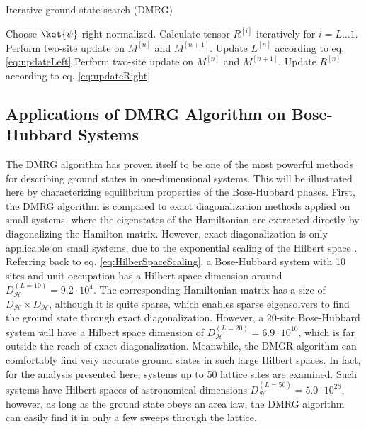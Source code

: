 \begin{algorithm}
\begin{algorithmic}
\caption{Iterative ground state search (DMRG)}
\State Choose $\ket{\psi}$ right-normalized.
\State Calculate tensor $R^{[i]}$ iteratively for $i = L \ldots 1$.
	 
		\State Perform two-site update on $M^{[n]}$ and $M^{[n+1]}$.
		\State Update $L^{[n]}$ according to eq. \eqref{eq:updateLeft}
	\EndFor
	 
		\State Perform two-site update on $M^{[n]}$ and $M^{[n+1]}$.
		\State Update $R^{[n]}$ according to eq. \eqref{eq:updateRight}
	\EndFor
\EndWhile
\end{algorithmic}
\end{algorithm}


\subsection{Applications of DMRG Algorithm on Bose-Hubbard Systems} \label{chap:CondFrac}
The DMRG algorithm has proven itself to be one of the most powerful methods for describing ground states in one-dimensional systems. This will be illustrated here by characterizing equilibrium properties of the Bose-Hubbard phases. First, the DMRG algorithm is compared to exact diagonalization methods applied on small systems, where the eigenstates of the Hamiltonian are extracted directly by diagonalizing the Hamilton matrix. However, exact diagonalization is only applicable on small systems, due to the exponential scaling of the Hilbert space \cite{Vidal2003}. Referring back to eq. \eqref{eq:HilberSpaceScaling}, a Bose-Hubbard system with 10 sites and unit occupation has a Hilbert space dimension around $D_{\mathcal{H}}^{(L = 10)} = 9.2 \cdot 10^{4}$. The corresponding Hamiltonian matrix has a size of $D_{\mathcal{H}} \times D_{\mathcal{H}}$, although it is quite sparse, which enables sparse eigensolvers to find the ground state through exact diagonalization.
However, a 20-site Bose-Hubbard system will have a Hilbert space dimension of $D_{\mathcal{H}}^{(L = 20)} = 6.9 \cdot 10^{10}$, which is far outside the reach of exact diagonalization. Meanwhile, the DMGR algorithm can comfortably find very accurate ground states in such large Hilbert spaces. In fact, for the analysis presented here, systems up to 50 lattice sites are examined. Such systems have Hilbert spaces of astronomical dimensions $D_{\mathcal{H}}^{(L = 50)} = 5.0 \cdot 10^{28}$, however, as long as the ground state obeys an area law, the DMRG algorithm can easily find it in only a few sweeps through the lattice.


